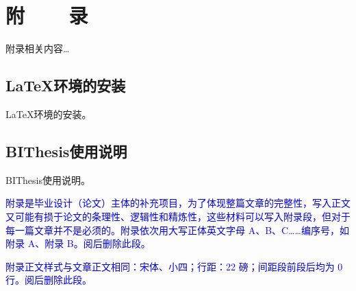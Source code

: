 %
%
%
%
%
%

\chapter*{\vskip 10bp \textmd{附~~~~录} \vskip -6bp}

\setcounter{section}{0}
\renewcommand*{\theHsection}{appendix.\the\value{section}}

附录相关内容…

\section{\LaTeX 环境的安装}

\LaTeX 环境的安装。

\section{BIThesis使用说明}

BIThesis使用说明。

\textcolor{blue}{附录是毕业设计（论文）主体的补充项目，为了体现整篇文章的完整性，写入正文又可能有损于论文的条理性、逻辑性和精炼性，这些材料可以写入附录段，但对于每一篇文章并不是必须的。附录依次用大写正体英文字母 A、B、C……编序号，如附录 A、附录 B。阅后删除此段。}

\textcolor{blue}{附录正文样式与文章正文相同：宋体、小四；行距：22 磅；间距段前段后均为 0 行。阅后删除此段。}
